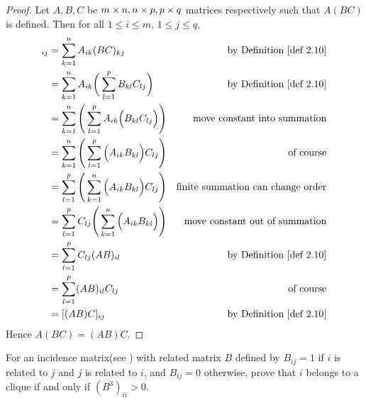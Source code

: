 \begin{proof}
Let \(A, B, C\) be \(m \times n, n \times p, p \times q\) matrices respectively such that \(A(BC)\) is defined.
Then for all \(1 \le i \le m\), \(1 \le j \le q\),
\begin{align*}
    [A(BC)]_{ij} & = \sum_{k = 1}^n A_{ik} (BC)_{kj} & \text{by \DEF{2.10}} \\
                 & = \sum_{k = 1}^n A_{ik} \bigg( \sum_{l = 1}^p B_{kl} C_{lj} \bigg) & \text{by \DEF{2.10}} \\
                 & = \sum_{k = 1}^n \Bigg( \sum_{l = 1}^p A_{ik} \Big(B_{kl} C_{lj} \Big) \Bigg) & \text{move constant into summation} \\
                 & = \sum_{k = 1}^n \Bigg( \sum_{l = 1}^p \Big( A_{ik} B_{kl} \Big) C_{lj} \Bigg) & \text{of course} \\
                 & = \sum_{l = 1}^p \Bigg( \sum_{k = 1}^n \Big( A_{ik} B_{kl} \Big) C_{lj} \Bigg) & \text{finite summation can change order} \\
                 & = \sum_{l = 1}^p C_{lj} \Bigg( \sum_{k = 1}^n \Big( A_{ik} B_{kl} \Big) \Bigg) & \text{move constant out of summation} \\
                 & = \sum_{l = 1}^p C_{lj} (AB)_{il} & \text{by \DEF{2.10}} \\
                 & = \sum_{l = 1}^p (AB)_{il} C_{lj} & \text{of course} \\
                 & = [(AB)C]_{ij} & \text{by \DEF{2.10}}
\end{align*}
Hence \(A(BC) = (AB)C\).
\end{proof}

\begin{exercise} \label{exercise 2.3.20}
For an incidence matrix(see ) with related matrix \(B\) defined by \(B_{ij} = 1\) if \(i\) is related to \(j\) and \(j\) is related to \(i\), and \(B_{ij} = 0\) otherwise,
prove that \(i\) belongs to a clique if and only if \((B^3)_{ii} > 0\).
\end{exercise}

